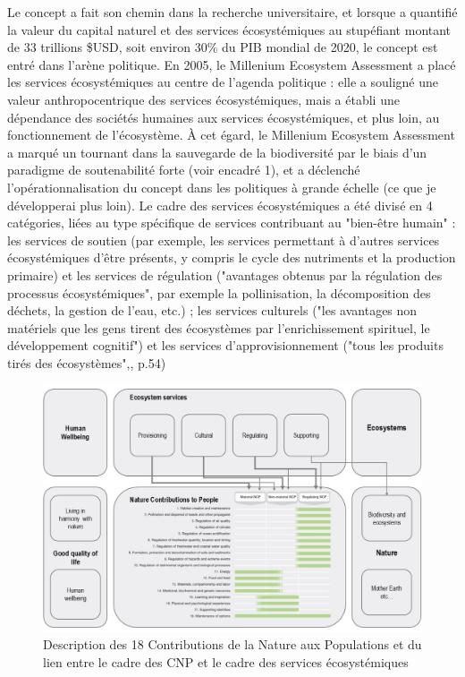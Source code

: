 Le concept a fait son chemin dans la recherche universitaire, et lorsque \cite{Costanza1997} a quantifié la valeur du capital naturel et des services écosystémiques au stupéfiant montant de 33 trillions \$USD, soit environ 30\% du PIB mondial de 2020, le concept est entré dans l'arène politique. En 2005, le Millenium Ecosystem Assessment \citep{MEA2005} a placé les services écosystémiques au centre de l'agenda politique : elle a souligné une valeur anthropocentrique des services écosystémiques, mais a établi une dépendance des sociétés humaines aux services écosystémiques, et plus loin, au fonctionnement de l'écosystème. À cet égard, le Millenium Ecosystem Assessment \citep{MEA2005} a marqué un tournant dans la sauvegarde de la biodiversité par le biais d'un paradigme de soutenabilité forte (voir encadré 1), et a déclenché l'opérationnalisation du concept dans les politiques à grande échelle (ce que je développerai plus loin). Le cadre des services écosystémiques a été divisé en 4 catégories, liées au type spécifique de services contribuant au "bien-être humain" : les services de soutien (par exemple, les services permettant à d'autres services écosystémiques d'être présents, y compris le cycle des nutriments et la production primaire) et les services de régulation ("avantages obtenus par la régulation des processus écosystémiques", par exemple la pollinisation, la décomposition des déchets, la gestion de l'eau, etc.) ; les services culturels ("les avantages non matériels que les gens tirent des écosystèmes par l'enrichissement spirituel, le développement cognitif") et les services d'approvisionnement ("tous les produits tirés des écosystèmes",\cite{MEA2005}, p.54)

\begin{figure}[h]
	\centering
	\includegraphics[width = \textwidth]{figures/intro/NCPs2.jpg}
	\caption{Description des 18 Contributions de la Nature aux Populations et du lien entre le cadre des CNP \citep{ipbes_2022_6417333} et le cadre des services écosystémiques \citep{millennium2005ecosystems}}
\end{figure}

